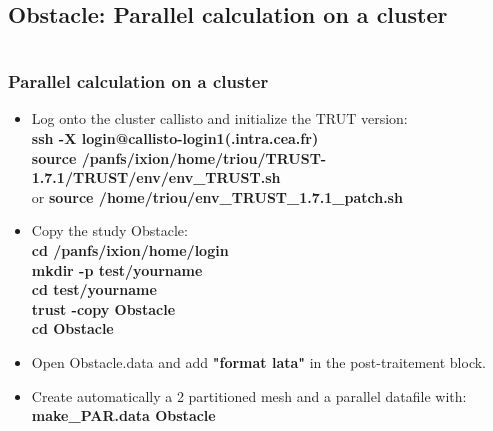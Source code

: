 \documentclass[10pt]{beamer}
\begin{document}
\subsection{Obstacle: Parallel calculation on a cluster}
\begin{frame}
\begin{columns}[c] 
\tableofcontents[sections={1-6},currentsection, currentsubsection]
\tableofcontents[sections={7-12},currentsection, currentsubsection]
\end{columns}
\end{frame}
\begin{frame}
\frametitle{Parallel calculation on a cluster}
\begin{block}{}

\begin{itemize}
\item Log onto the cluster callisto and initialize the TRUT version: \\
\vspace{0.2cm}
{\small{
\textbf{ssh -X login@callisto-login1(.intra.cea.fr)} \\
\textbf{source /panfs/ixion/home/triou/TRUST-1.7.1/TRUST/env/env\_TRUST.sh}\\
or 
\textbf{source /home/triou/env\_TRUST\_1.7.1\_patch.sh}\\
}}
\vspace{0.2cm}

\item Copy the study Obstacle:\\
\vspace{0.2cm}
\textbf{cd /panfs/ixion/home/login}\\
\textbf{mkdir -p test/yourname} \\
\textbf{cd test/yourname} \\
\textbf{trust -copy Obstacle} \\
\textbf{cd Obstacle} \\
\vspace{0.2cm}

\item Open Obstacle.data and add \textbf{"format lata"} in the post-traitement block.
\vspace{0.2cm}

\item Create automatically a 2 partitioned mesh and a parallel datafile with:
\vspace{0.2cm}
\textbf{make\_PAR.data Obstacle}
\end{itemize}

\end{block}
\end{frame}
\end{document}
